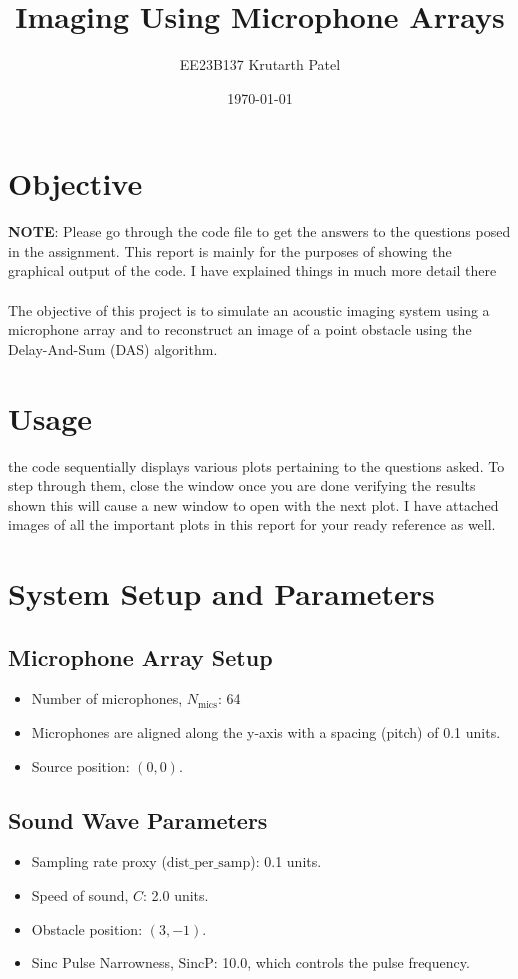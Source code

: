 \documentclass{article}
\title{Imaging Using Microphone Arrays}
\author{EE23B137 Krutarth Patel}
\date{\today}
\begin{document}
\maketitle

\section{Objective}
\textbf{NOTE}: Please go through the code file to get the answers to the questions posed in the assignment. This report is mainly for the purposes of showing the graphical output
of the code. I have explained things in much more detail there \\
\\
The objective of this project is to simulate an acoustic imaging system using a microphone array and to reconstruct an image of a point obstacle using the Delay-And-Sum (DAS) algorithm. 

\section{Usage}
the code sequentially displays various plots pertaining to the questions asked. To step through them, close the window once you are done verifying the results
shown this will cause a new window to open with the next plot. I have attached images of all the important plots in this report for your ready reference as well.
\section{System Setup and Parameters}
\subsection{Microphone Array Setup}
\begin{itemize}
    \item Number of microphones, $N_{\text{mics}}$: 64
    \item Microphones are aligned along the y-axis with a spacing (pitch) of 0.1 units.
    \item Source position: $(0, 0)$.
\end{itemize}

\subsection{Sound Wave Parameters}
\begin{itemize}
    \item Sampling rate proxy ($\text{dist\_per\_samp}$): 0.1 units.
    \item Speed of sound, $C$: 2.0 units.
    \item Obstacle position: $(3, -1)$.
    \item Sinc Pulse Narrowness, $\text{SincP}$: 10.0, which controls the pulse frequency.
\end{itemize}
\end{document}
